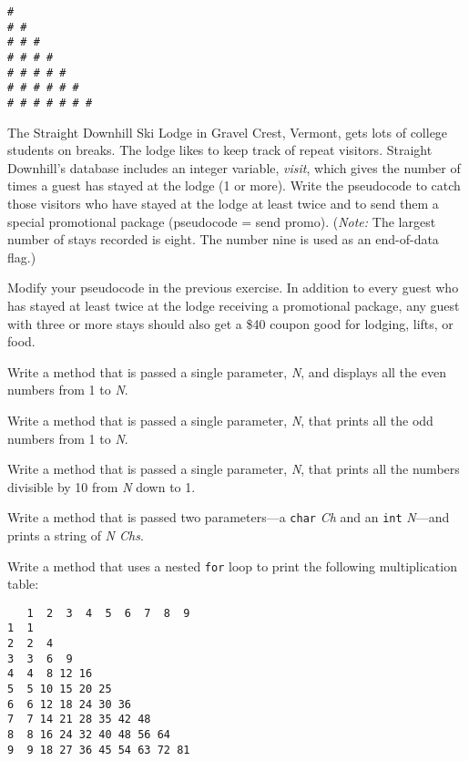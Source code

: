 \begin{EXRtwo}
\begin{jjjlisting}
\begin{lstlisting}
#
# #
# # #
# # # #
# # # # #
# # # # # #
# # # # # # #
\end{lstlisting}
\end{jjjlisting}


\item  The Straight Downhill Ski Lodge in Gravel Crest, Vermont, gets
lots of college students on breaks. The lodge likes to keep track of
repeat visitors. Straight Downhill's database includes an integer
variable, {\it visit}, which gives the number of times a guest has
stayed at the lodge (1 or more). Write the pseudocode to catch those
visitors who have stayed at the lodge at least twice and to send them
a special promotional package (pseudocode = send promo).  ({\it Note:}
The largest number of stays recorded is eight. The number nine is used
as an end-of-data flag.)

\item  Modify your pseudocode in the previous exercise. In addition to
every guest who has stayed at least twice at the lodge receiving a
promotional package, any guest with three or more stays should also get a
\$40 coupon good for lodging, lifts, or food.

\item  Write a method that is passed a single parameter, {\it N}, and displays
all the even numbers from 1 to {\it N}.

\item  Write a method that is passed a single parameter, {\it N}, that prints
all the odd numbers from 1 to {\it N}.

\item  Write a method that is passed a single parameter, {\it N}, that prints
all the numbers divisible by 10 from {\it N} down to 1.

\item  Write a method that is passed two parameters---a {\tt char} {\it Ch} and
an {\tt int} {\it N}---and prints a string of {\it N Chs}.

\item  Write a method that uses a nested {\tt for} loop to print the
following multiplication table:

\begin{jjjlisting}
\begin{lstlisting}
   1  2  3  4  5  6  7  8  9
1  1
2  2  4
3  3  6  9
4  4  8 12 16
5  5 10 15 20 25
6  6 12 18 24 30 36
7  7 14 21 28 35 42 48
8  8 16 24 32 40 48 56 64
9  9 18 27 36 45 54 63 72 81
\end{lstlisting}
\end{jjjlisting}



\end{EXRtwo}
